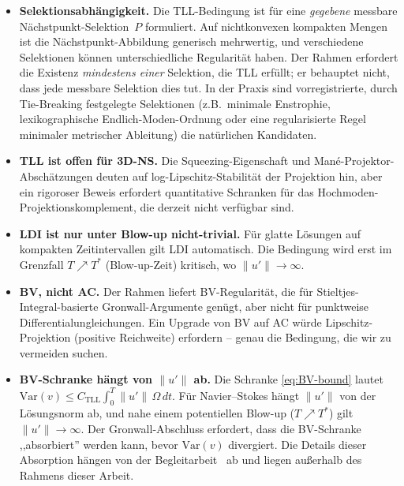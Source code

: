 \documentclass[12pt,a4paper]{article}
\theoremstyle{definition}
\theoremstyle{plain}
\theoremstyle{remark}
\newcommand{\Var}{\mathrm{Var}}
\begin{document}
\begin{itemize}
  \item \textbf{Selektionsabhängigkeit.}\;
    Die TLL-Bedingung ist für eine \emph{gegebene} messbare
    Nächstpunkt-Selektion~$P$ formuliert.  Auf nichtkonvexen
    kompakten Mengen ist die Nächstpunkt-Abbildung generisch
    mehrwertig, und verschiedene Selektionen können unterschiedliche
    Regularität haben.  Der Rahmen erfordert die Existenz
    \emph{mindestens einer} Selektion, die TLL erfüllt; er
    behauptet nicht, dass jede messbare Selektion dies tut.
    In der Praxis sind vorregistrierte, durch Tie-Breaking festgelegte Selektionen
    (z.B.\ minimale Enstrophie, lexikographische Endlich-Moden-Ordnung
    oder eine regularisierte Regel minimaler metrischer Ableitung) die natürlichen
    Kandidaten.
  \item \textbf{TLL ist offen für 3D-NS.}\;
    Die Squeezing-Eigenschaft und Mané-Projektor-Abschätzungen
    deuten auf log-Lipschitz-Stabilität der Projektion hin, aber ein
    rigoroser Beweis erfordert quantitative Schranken für das
    Hochmoden-Projektionskomplement, die derzeit nicht verfügbar sind.
  \item \textbf{LDI ist nur unter Blow-up nicht-trivial.}\;
    Für glatte Lösungen auf kompakten Zeitintervallen gilt LDI
    automatisch.  Die Bedingung wird erst im Grenzfall
    $T \nearrow T^*$ (Blow-up-Zeit) kritisch, wo $\|u'\| \to \infty$.
  \item \textbf{BV, nicht AC.}\;
    Der Rahmen liefert BV-Regularität, die für
    Stieltjes-Integral-basierte Gronwall-Argumente genügt, aber nicht
    für punktweise Differentialungleichungen.  Ein Upgrade von BV auf
    AC würde Lipschitz-Projektion (positive Reichweite) erfordern --
    genau die Bedingung, die wir zu vermeiden suchen.
  \item \textbf{BV-Schranke hängt von $\|u'\|$ ab.}\;
    Die Schranke \eqref{eq:BV-bound} lautet
    $\Var(v) \le C_{\mathrm{TLL}} \int_0^T \|u'\|\,\Omega\,dt$.
    Für Navier--Stokes hängt $\|u'\|$ von der Lösungsnorm ab,
    und nahe einem potentiellen Blow-up ($T \nearrow T^*$) gilt
    $\|u'\| \to \infty$. Der Gronwall-Abschluss erfordert, dass die
    BV-Schranke ,,absorbiert'' werden kann, bevor $\Var(v)$ divergiert.
    Die Details dieser Absorption hängen von der
    Begleitarbeit~\cite{FST-NS2026} ab und liegen außerhalb des
    Rahmens dieser Arbeit.
\end{itemize}
\end{document}
